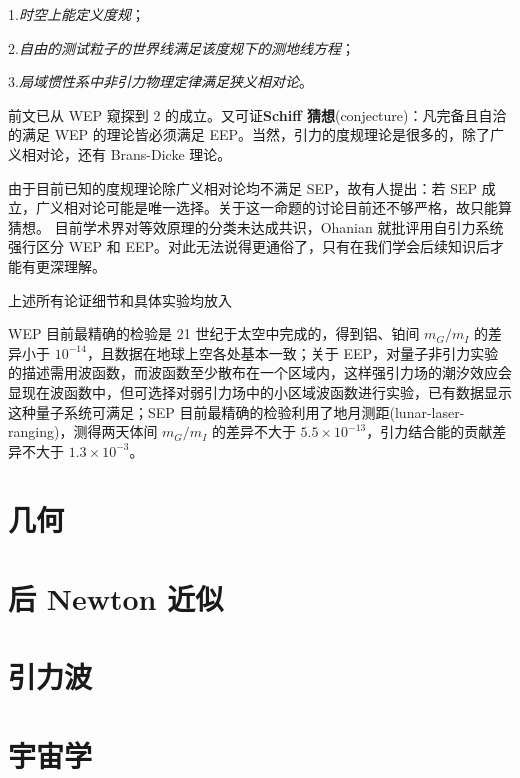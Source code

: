 1.\textit{时空上能定义度规}；

2.\textit{自由的测试粒子的世界线满足该度规下的测地线方程}；

3.\textit{局域惯性系中非引力物理定律满足狭义相对论}。

\noindent 前文已从 WEP 窥探到 2 的成立。又可证\textbf{Schiff 猜想}(conjecture)：凡完备且自洽的满足 WEP 的理论皆必须满足 EEP。当然，引力的度规理论是很多的，除了广义相对论，还有 Brans-Dicke 理论。

 由于目前已知的度规理论除广义相对论均不满足 SEP，故有人提出：若 SEP 成立，广义相对论可能是唯一选择。关于这一命题的讨论目前还不够严格，故只能算猜想。
目前学术界对等效原理的分类未达成共识，Ohanian\cite{Ohanian} 就批评用自引力系统强行区分 WEP 和 EEP。对此无法说得更通俗了，只有在我们学会后续知识后才能有更深理解。

上述所有论证细节和具体实验均放入

WEP 目前最精确的检验是 21 世纪于太空中完成的，得到铝、铂间 $m_G/m_I$ 的差异小于 $10^{-14}$，且数据在地球上空各处基本一致；关于 EEP，对量子非引力实验的描述需用波函数，而波函数至少散布在一个区域内，这样强引力场的潮汐效应会显现在波函数中，但可选择对弱引力场中的小区域波函数进行实验，已有数据显示这种量子系统可满足；SEP 目前最精确的检验利用了地月测距(lunar-laser-ranging)，测得两天体间 $m_G/m_I$ 的差异不大于 $5.5\times 10^{-13}$，引力结合能的贡献差异不大于 $1.3\times 10^{-3}$。


\section{几何}


\section{后 Newton 近似}

\section{引力波}

\section{宇宙学}